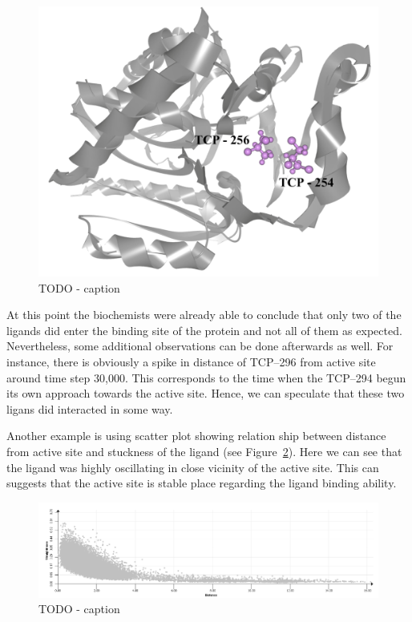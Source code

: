 \documentclass[twocolumn]{bmcart}%
\begin{document}
\begin{figure}[htb]
\centering
\includegraphics[width=0.95\linewidth]{img/tcp3_3D.pdf}
  \caption{
  \label{fig:tcp3_3D}
  TODO - caption
  }
\end{figure} 

At this point the biochemists were already able to conclude that only two of the ligands did enter the binding site of the protein and not all of them as expected.
Nevertheless, some additional observations can be done afterwards as well.  
For instance, there is obviously a spike in distance of TCP--296 from active site around time step 30,000. 
This corresponds to the time when the TCP--294 begun its own approach towards the active site.
Hence, we can speculate that these two ligans did interacted in some way.

Another example is using scatter plot showing relation ship between distance from active site and stuckness of the ligand (see Figure~\ref{fig:tcp3_dist_stuckness_295}).
Here we can see that the ligand was highly oscillating in close vicinity of the active site.
This can suggests that the active site is stable place regarding the ligand binding ability.



\begin{figure}[htb]
	\centering
	\includegraphics[width=0.95\linewidth]{img/tcp3_dist_stuckness_295.png}
  \caption{
  \label{fig:tcp3_dist_stuckness_295}
  TODO - caption
  }
\end{figure}
\end{document}
